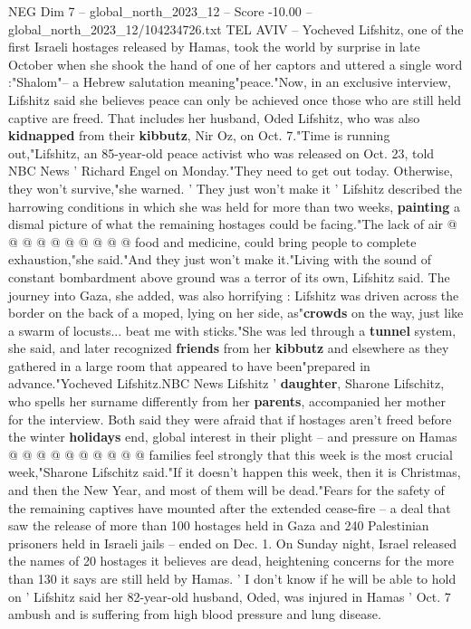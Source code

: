 \begin{textsample}{NEG Dim 7 – global\_north\_2023\_12 – Score -10.00 – global\_north\_2023\_12/104234726.txt}  \label{ex:f7_neg_142}
TEL AVIV -- Yocheved Lifshitz, one of the first Israeli hostages released by Hamas, took the world by surprise in late October when she shook the hand of one of her captors and uttered a single word :"Shalom"-- a Hebrew salutation meaning"peace."Now, in an exclusive interview, Lifshitz said she believes peace can only be achieved once those who are still held captive are freed.
That includes her husband, Oded Lifshitz, who was also \textbf{kidnapped} from their \textbf{kibbutz}, Nir Oz, on Oct. 7."Time is running out,"Lifshitz, an 85-year-old peace activist who was released on Oct. 23, told NBC News ' Richard Engel on Monday."They need to get out today.
Otherwise, they won't survive,"she warned. ' They just won't make it ' Lifshitz described the harrowing conditions in which she was held for more than two weeks, \textbf{painting} a dismal picture of what the remaining hostages could be facing."The lack of air @ @ @ @ @ @ @ @ @ @ food and medicine, could bring people to complete exhaustion,"she said."And they just won't make it."Living with the sound of constant bombardment above ground was a terror of its own, Lifshitz said.
The journey into Gaza, she added, was also horrifying : Lifshitz was driven across the border on the back of a moped, lying on her side, as"\textbf{crowds} on the way, just like a swarm of locusts... beat me with sticks."She was led through a \textbf{tunnel} system, she said, and later recognized \textbf{friends} from her \textbf{kibbutz} and elsewhere as they gathered in a large room that appeared to have been"prepared in advance."Yocheved Lifshitz.NBC News Lifshitz ' \textbf{daughter}, Sharone Lifschitz, who spells her surname differently from her \textbf{parents}, accompanied her mother for the interview.
Both said they were afraid that if hostages aren't freed before the winter \textbf{holidays} end, global interest in their plight -- and pressure on Hamas @ @ @ @ @ @ @ @ @ @ families feel strongly that this week is the most crucial week,"Sharone Lifschitz said."If it doesn't happen this week, then it is Christmas, and then the New Year, and most of them will be dead."Fears for the safety of the remaining captives have mounted after the extended cease-fire -- a deal that saw the release of more than 100 hostages held in Gaza and 240 Palestinian prisoners held in Israeli jails -- ended on Dec. 1.
On Sunday night, Israel released the names of 20 hostages it believes are dead, heightening concerns for the more than 130 it says are still held by Hamas. ' I don't know if he will be able to hold on ' Lifshitz said her 82-year-old husband, Oded, was injured in Hamas ' Oct. 7 ambush and is suffering from high blood pressure and lung disease.

\end{textsample}
